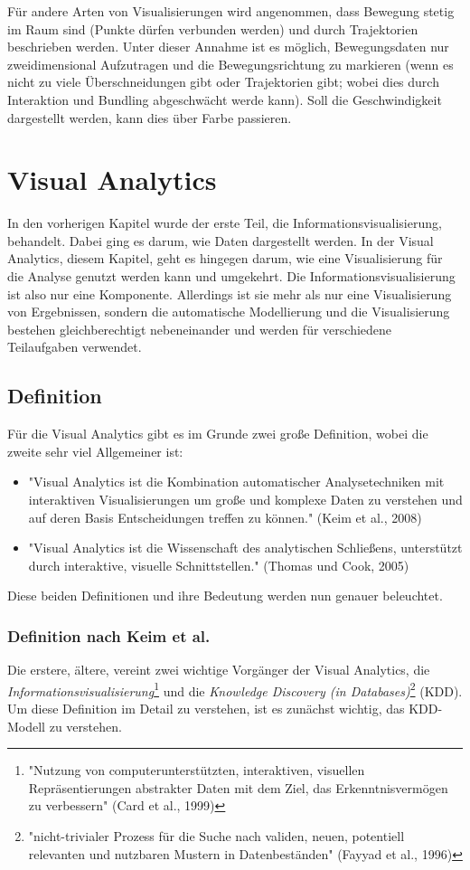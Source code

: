 			Für andere Arten von Visualisierungen wird angenommen, dass Bewegung stetig im Raum sind (\dh Punkte dürfen verbunden werden) und durch Trajektorien beschrieben werden. Unter dieser Annahme ist es möglich, Bewegungsdaten nur zweidimensional Aufzutragen und die Bewegungsrichtung zu markieren (wenn es nicht zu viele Überschneidungen gibt oder Trajektorien gibt; wobei dies durch Interaktion und Bundling abgeschwächt werde kann). Soll die Geschwindigkeit dargestellt werden, kann dies \bspw über Farbe passieren.

\chapter{Visual Analytics}
	In den vorherigen Kapitel wurde der erste Teil, die Informationsvisualisierung, behandelt. Dabei ging es darum, wie Daten dargestellt werden. In der Visual Analytics, diesem Kapitel, geht es hingegen darum, wie eine Visualisierung für die Analyse genutzt werden kann und umgekehrt. Die Informationsvisualisierung ist also nur eine Komponente. Allerdings ist sie mehr als nur eine Visualisierung von Ergebnissen, sondern die automatische Modellierung und die Visualisierung bestehen gleichberechtigt nebeneinander und werden für verschiedene Teilaufgaben verwendet.

	\section{Definition}
		Für die Visual Analytics gibt es im Grunde zwei große Definition, wobei die zweite sehr viel Allgemeiner ist:
		\begin{itemize}
			\item "Visual Analytics ist die Kombination automatischer Analysetechniken mit interaktiven Visualisierungen um große und komplexe Daten zu verstehen und auf deren Basis Entscheidungen treffen zu können." (Keim et al., 2008)
			\item "Visual Analytics ist die Wissenschaft des analytischen Schließens, unterstützt durch interaktive, visuelle Schnittstellen." (Thomas und Cook, 2005)
		\end{itemize}
		Diese beiden Definitionen und ihre Bedeutung werden nun genauer beleuchtet.

		\subsection{Definition nach Keim et al.}
			Die erstere, ältere, vereint zwei wichtige Vorgänger der Visual Analytics, die \emph{Informationsvisualisierung}\footnote{"Nutzung von computerunterstützten, interaktiven, visuellen Repräsentierungen abstrakter Daten mit dem Ziel, das Erkenntnisvermögen zu verbessern" (Card et al., 1999)} und die \emph{Knowledge Discovery (in Databases)}\footnote{"nicht-trivialer Prozess für die Suche nach validen, neuen, potentiell relevanten und nutzbaren Mustern in Datenbeständen" (Fayyad et al., 1996)} (KDD). Um diese Definition im Detail zu verstehen, ist es zunächst wichtig, das KDD-Modell zu verstehen.

